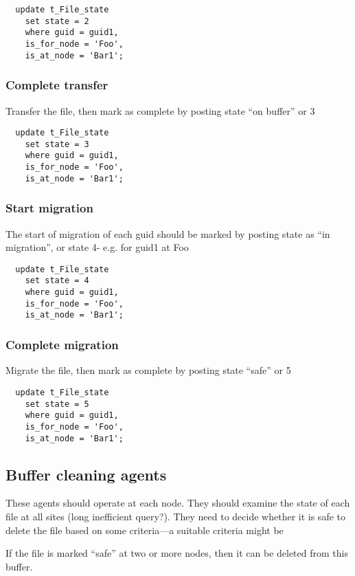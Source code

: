 \documentclass{cmspaper}
\begin{document}
{\small\begin{verbatim}
  update t_File_state
    set state = 2
    where guid = guid1,
    is_for_node = 'Foo',
    is_at_node = 'Bar1';
  \end{verbatim}}

\subsubsection{Complete transfer}
Transfer the file, then mark as complete by posting state ``on buffer'' or 3

{\small\begin{verbatim}
  update t_File_state
    set state = 3
    where guid = guid1,
    is_for_node = 'Foo',
    is_at_node = 'Bar1';
\end{verbatim}}

\subsubsection{Start migration}
The start of migration of each guid should be marked by posting state as ``in migration'', or state 4- e.g. for guid1 at Foo

{\small\begin{verbatim}
  update t_File_state
    set state = 4
    where guid = guid1,
    is_for_node = 'Foo',
    is_at_node = 'Bar1';
\end{verbatim}}

\subsubsection{Complete migration}
Migrate the file, then mark as complete by posting state ``safe'' or 5

{\small\begin{verbatim}
  update t_File_state
    set state = 5
    where guid = guid1,
    is_for_node = 'Foo',
    is_at_node = 'Bar1';
\end{verbatim}}


\subsection{Buffer cleaning agents}

These agents should operate at each node. They should examine the
state of each file at all sites (long inefficient query?). They need
to decide whether it is safe to delete the file based on some
criteria---a suitable criteria might be

If the file is marked ``safe'' at two or more nodes, then it can be
deleted from this buffer.
\end{document}
